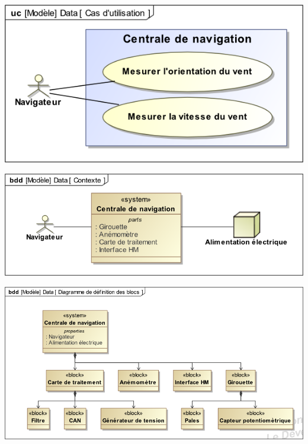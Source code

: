 \documentclass[10pt]{article}
\begin{document}
\vspace{.25cm}

\begin{minipage}[c]{.32\linewidth}
\begin{center}
\includegraphics[width=\textwidth]{images/uc}
\end{center}
\end{minipage} \hfill
\begin{minipage}[c]{.32\linewidth}
\begin{center}
\includegraphics[width=\textwidth]{images/contexte}
\end{center}
\end{minipage}  \hfill
\begin{minipage}[c]{.32\linewidth}
\begin{center}
\includegraphics[width=\textwidth]{images/bdd}
\end{center}
\end{minipage} 
\end{document}
